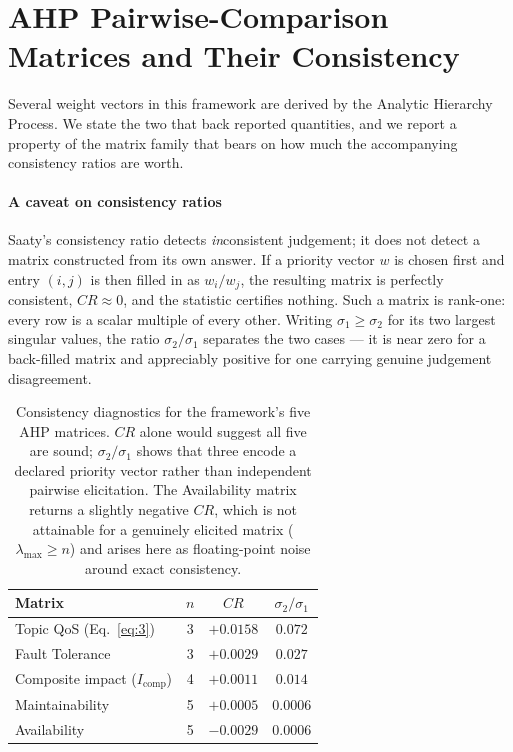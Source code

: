 \appendix
\section{AHP Pairwise-Comparison Matrices and Their Consistency}
\label{app:ahp}

Several weight vectors in this framework are derived by the Analytic Hierarchy Process. We state the two that back reported quantities, and we report a property of the matrix family that bears on how much the accompanying consistency ratios are worth.

\paragraph{A caveat on consistency ratios} Saaty's consistency ratio detects \emph{in}consistent judgement; it does not detect a matrix constructed from its own answer. If a priority vector $w$ is chosen first and entry $(i,j)$ is then filled in as $w_i / w_j$, the resulting matrix is perfectly consistent, $CR \approx 0$, and the statistic certifies nothing. Such a matrix is rank-one: every row is a scalar multiple of every other. Writing $\sigma_1 \ge \sigma_2$ for its two largest singular values, the ratio $\sigma_2 / \sigma_1$ separates the two cases --- it is near zero for a back-filled matrix and appreciably positive for one carrying genuine judgement disagreement.

\begin{table}[htbp]
\centering
\small
\caption{Consistency diagnostics for the framework's five AHP matrices. $CR$ alone would suggest all five are sound; $\sigma_2/\sigma_1$ shows that three encode a declared priority vector rather than independent pairwise elicitation. The Availability matrix returns a slightly negative $CR$, which is not attainable for a genuinely elicited matrix ($\lambda_{\max} \ge n$) and arises here as floating-point noise around exact consistency.}
\label{tab:ahp-diag}
\begin{tabular}{lccc}
\toprule
\textbf{Matrix} & \textbf{$n$} & \textbf{$CR$} & \textbf{$\sigma_2/\sigma_1$} \\
\midrule
Topic QoS (Eq.~\ref{eq:3}) & 3 & $+0.0158$ & $0.072$ \\
Fault Tolerance & 3 & $+0.0029$ & $0.027$ \\
\midrule
Composite impact ($I_{\text{comp}}$) & 4 & $+0.0011$ & $0.014$ \\
Maintainability & 5 & $+0.0005$ & $0.0006$ \\
Availability & 5 & $-0.0029$ & $0.0006$ \\
\bottomrule
\end{tabular}
\end{table}


